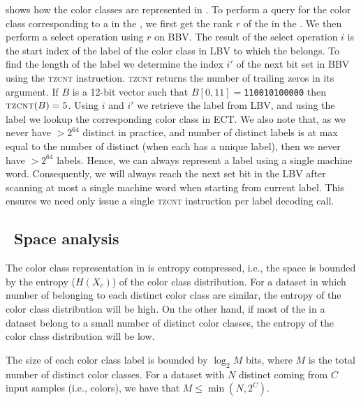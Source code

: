  shows how the color classes are represented in \rainbowfish. To
perform a query for the color class corresponding to a \kmer in the \cdbg, we
first get the rank $r$ of the \kmer in the \dbg. We then perform a select
operation using $r$ on BBV. The result of the select operation $i$ is the start
index of the label of the color class in LBV to which the \kmer belongs.
%
To find the length of the label we determine the index $i'$ of the next bit set
in BBV using the \textsc{tzcnt} instruction.
%
\textsc{tzcnt} returns the number of trailing zeros in its argument. If $B$ is a
12-bit vector such that $B[0,11]=$\texttt{110010100000} then
$\textsc{tzcnt}(B)=5$.
%
%
Using $i$ and $i'$ we retrieve the label from LBV, and using
the label we lookup the corresponding color class in ECT.
%
We also note that, as we never have $> 2^{64}$ distinct \kmers in practice, and
number of distinct labels is at max equal to the number of distinct \kmers (when
each \kmer has a unique label), then we never have $> 2^{64}$ labels. Hence, we can
always represent a label using a single machine word. Consequently, we will
always reach the next set bit in the LBV after scanning at most a single machine
word when starting from current label. This ensures we need only issue a single
\textsc{tzcnt} instruction per label decoding call.


\subsection{~Space analysis}
\label{rainbowfish-space-bound}

The color class representation in \rainbowfish is entropy compressed, i.e.,
the space is bounded by the entropy ($H(X_c)$) of the color class distribution. 
For a dataset in which number of \kmers belonging to each distinct color class are
similar, the entropy of the color class distribution will be high. On the other
hand, if most of the \kmers in a dataset belong to a small number of distinct
color classes, the entropy of the color class distribution will be low.

\begin{lemma}
  The size of each color class label is bounded by $\log_2{M}$ bits, where
  $M$ is the total number of distinct color classes. For a dataset with $N$
  distinct \kmers coming from $C$ input samples (i.e., colors), we have that $M
  \leq \min(N,2^C)$.
  \label{label-size-bound}
\end{lemma}

